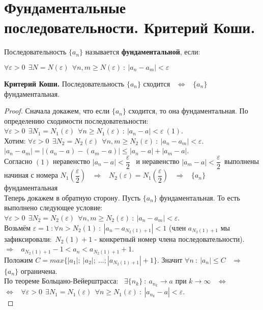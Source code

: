\documentclass[12pt]{article}
\begin{document}
\section{Фундаментальные последовательности. Критерий Коши.}
Последовательность $\{a_n\}$ называется \textbf{фундаментальной}, если:
\begin{center}
    $\forall \varepsilon > 0 \ \ \exists N = N(\varepsilon)  \ \ \forall n, m \geq N(\varepsilon) \ : \ |a_n - a_m| < \varepsilon$ 
\end{center}
\textbf{Критерий Коши.} Последовательность $\{a_n\}$ сходится \ $\Leftrightarrow$ \  $\{a_n\}$ фундаментальная.
\begin{proof}
    Сначала докажем, что если $\{a_n\}$ сходится, то она фундаментальная. По определению сходимости последовательности: $\forall \varepsilon > 0 \ \ \exists N_1 = N_1(\varepsilon) \ \ \forall n \geq N_1(\varepsilon) \ : \ |a_n - a| < \varepsilon \ (1)$. \\
    Хотим: $\forall \varepsilon > 0 \ \ \exists N_2 = N_2(\varepsilon) \ \ \forall n, m \geq N_2(\varepsilon) \ : \ |a_n - a_m| < \varepsilon$. \\
    $|a_n - a_m| = |(a_n - a) - (a_m - a)| \leq |a_n - a| + |a_m - a|$. \\ Согласно $(1)$ неравенство $|a_n - a| < \dfrac{\varepsilon}{2}$ \ и неравенство $|a_m - a| < \dfrac{\varepsilon}{2}$\ выполнены начиная с номера $N_1\left(\dfrac{\varepsilon}{2}\right)$ \ $\Rightarrow$ \ $N_2(\varepsilon) = N_1\left(\dfrac{\varepsilon}{2}\right)$  \ $\Rightarrow$ \ $\{a_n\}$ фундаментальная\\
    Теперь докажем в обратную сторону. Пусть $\{a_n\}$ фундаментальная. То есть выполнено следующее условие: $\forall \varepsilon > 0 \ \ \exists N_2 = N_2(\varepsilon) \ \ \forall n, m \geq N_2(\varepsilon) \ : \ |a_n - a_m| < \varepsilon$. \\
    Возьмём $\varepsilon = 1 \ : \forall n > N_2(1) \ : \ |a_n - a_{N_2(1)+1}| < 1$ (член $a_{N_2(1)+1}$ мы зафиксировали:\ $N_2(1)+1$ - конкретный номер члена последовательности). \ $\Rightarrow$ \ $a_{N_2(1)+1} - 1 < a_n < a_{N_2(1)+1} + 1$. \\
    Положим $C = max\{|a_1|; \ |a_2|; \ ...; |a_{N_2(1)+1}| + 1 \}$. Значит $\forall n \ : \ |a_n| \leq C$ \ $\Rightarrow$ \ $\{a_n\}$ ограничена.\\
    По теореме Больцано-Вейерштрасса: \ $\exists \{n_k\} \ : \ a_{n_k} \to a$ при $k \to \infty$ \ $\Leftrightarrow$ \\ $\Leftrightarrow$ \ $\forall \varepsilon > 0 \ \ \exists N_1 = N_1(\varepsilon) \ \ \forall n \geq N_1(\varepsilon) \ : \ |a_{n_k} - a| < \varepsilon$. \\

\end{proof}
\end{document}
